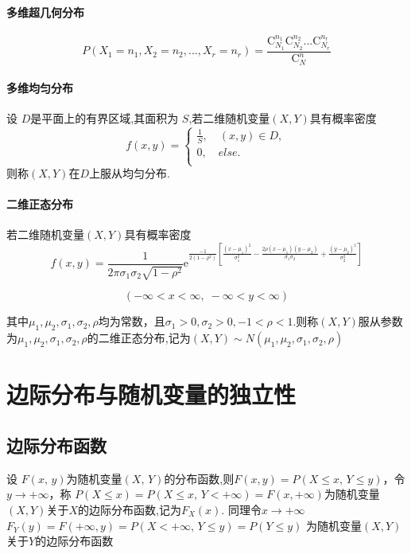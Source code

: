 \paragraph{多维超几何分布}
$$P({X_1} = {n_1},{X_2} = {n_2},...,{X_r} = {n_r}) = \frac{{{\text{C}}_{{N_1}}^{{n_1}}{\text{C}}_{{N_2}}^{{n_2}}...{\text{C}}_{{N_r}}^{{n_r}}}}{{{\text{C}}_N^n}}$$

\paragraph{多维均匀分布}
设 $D$是平面上的有界区域,其面积为 $S$,若二维随机变量$(X,Y)$具有概率密度$$f(x,y) = \left\{ \begin{gathered}
        \frac{1}{S},\quad (x,y) \in D,  \\
        0,\quad  else.  \\
    \end{gathered}  \right.$$
则称$(X,Y)$在$D$上服从均匀分布.

\paragraph{二维正态分布}
若二维随机变量$(X,Y)$具有概率密度
$$
    f(x,y) = \frac{1}{{2{\pi}{\sigma _1}{\sigma _2}\sqrt {1 - {\rho ^2}} }}{{\text{e}}^{\frac{{ - 1}}{{2(1 - {\rho ^2})}}\left[ {\frac{{{{(x - {\mu _1})}^2}}}{{\sigma _1^2}} - \frac{{2\rho (x - {\mu _1})(y - {\mu _2})}}{{{\sigma _1}{\sigma _2}}} + \frac{{{{(y - {\mu _2})}^2}}}{{\sigma _2^2}}} \right]}}$$

$$( - \infty  < x < \infty ,\; - \infty  < y < \infty )$$

其中${\mu _1},{\mu _2},{\sigma _1},{\sigma _2},\rho $均为常数，且${\sigma _1} > 0,{\sigma _2} > 0, - 1 < \rho  < 1$.则称$(X,Y)$服从参数为${\mu _1},{\mu _2},{\sigma _1},{\sigma _2},\rho $的二维正态分布,记为$(X,Y) \sim N({\mu _1},{\mu _2},{\sigma _1},{\sigma _2},\rho )$



\section{边际分布与随机变量的独立性}
\subsection{边际分布函数}
设 $F(x,\,y)$为随机变量$(X,\,Y)$的分布函数,则$F(x,y) = P( X \leqslant x,\,Y \leqslant y) $，令$y \to  + \infty $，称
$P( X \leqslant x)  = P( X \leqslant x,\,Y <  + \infty )  = F(x, + \infty )$为随机变量$(X,Y)$关于$X$的边际分布函数,记为$F_X(x)$.
同理令$x \to  + \infty $
$F_Y(y)=F(+ \infty,y )  = P( X < +\infty,\,Y \leqslant y )=P(Y \leqslant y)$
为随机变量$(X,Y)$关于$Y$的边际分布函数

